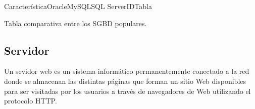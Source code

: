 \begin{comparativa}{Característica}{Oracle}{MySQL}{SQL Server}{IDTabla}
	
	\caption{Tabla comparativa entre los SGBD populares.}
\end{comparativa}

\subsection{Servidor}
Un sevidor web es un sistema informático permanentemente conectado a la red donde se almacenan las distintas páginas que forman un sitio Web disponibles para ser visitadas por los usuarios a través de navegadores de Web utilizando el protocolo HTTP.%













